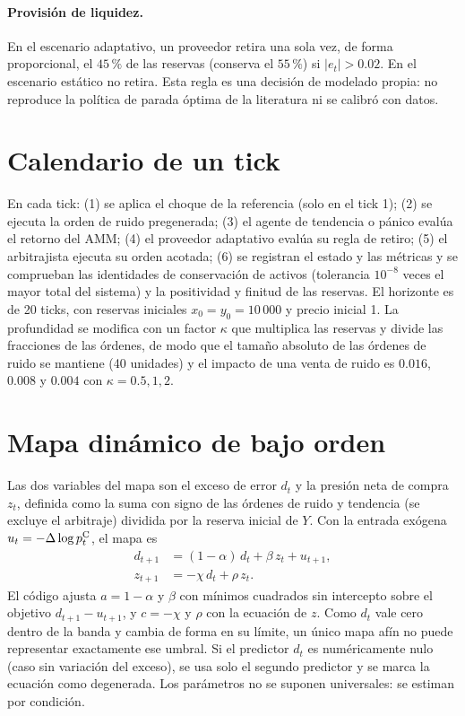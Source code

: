 \paragraph{Provisión de liquidez.} En el escenario adaptativo, un proveedor retira una sola vez, de forma proporcional, el $45\,\%$ de las reservas (conserva el $55\,\%$) si $|e_t|>0.02$. En el escenario estático no retira. Esta regla es una decisión de modelado propia: no reproduce la política de parada óptima de la literatura \cite{bergault2025exit} ni se calibró con datos.

\section{Calendario de un tick}

En cada tick: (1) se aplica el choque de la referencia (solo en el tick 1); (2) se ejecuta la orden de ruido pregenerada; (3) el agente de tendencia o pánico evalúa el retorno del AMM; (4) el proveedor adaptativo evalúa su regla de retiro; (5) el arbitrajista ejecuta su orden acotada; (6) se registran el estado y las métricas y se comprueban las identidades de conservación de activos (tolerancia $10^{-8}$ veces el mayor total del sistema) y la positividad y finitud de las reservas. El horizonte es de 20 ticks, con reservas iniciales $x_0=y_0=10\,000$ y precio inicial 1. La profundidad se modifica con un factor $\kappa$ que multiplica las reservas y divide las fracciones de las órdenes, de modo que el tamaño absoluto de las órdenes de ruido se mantiene (40 unidades) y el impacto de una venta de ruido es $0.016$, $0.008$ y $0.004$ con $\kappa=0.5,1,2$.

\section{Mapa dinámico de bajo orden}

Las dos variables del mapa son el exceso de error $d_t$ y la presión neta de compra $z_t$, definida como la suma con signo de las órdenes de ruido y tendencia (se excluye el arbitraje) dividida por la reserva inicial de $Y$. Con la entrada exógena $u_t=-\Delta\log p^{\mathrm{C}}_t$, el mapa es
\begin{align}
  d_{t+1} &= (1-\alpha)\,d_t + \beta\,z_t + u_{t+1}, \label{eq:mapa-d}\\
  z_{t+1} &= -\chi\,d_t + \rho\,z_t. \label{eq:mapa-z}
\end{align}
El código ajusta $a=1-\alpha$ y $\beta$ con mínimos cuadrados sin intercepto sobre el objetivo $d_{t+1}-u_{t+1}$, y $c=-\chi$ y $\rho$ con la ecuación de $z$. Como $d_t$ vale cero dentro de la banda y cambia de forma en su límite, un único mapa afín no puede representar exactamente ese umbral. Si el predictor $d_t$ es numéricamente nulo (caso sin variación del exceso), se usa solo el segundo predictor y se marca la ecuación como degenerada. Los parámetros no se suponen universales: se estiman por condición.


